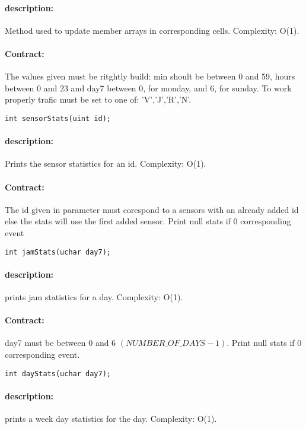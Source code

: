 \documentclass[a4paper, 12pts]{article}
\begin{document}
\paragraph{description:}
	Method used to update member arrays in corresponding cells. Complexity: O(1).
\paragraph{Contract:}
	The values given must be ritghtly build: min shoult be between 0 and 59, hours between 0 and 23 and day7 between 0, for monday, and 6, for sunday. To work properly trafic must be set to one of: 'V','J','R','N'.

\begin{lstlisting}
int sensorStats(uint id);
\end{lstlisting}
\paragraph{description:}
	Prints the sensor statistics for an id. Complexity: O(1).
\paragraph{Contract:}
	The id given in parameter must corespond to a sensors with an already added id else the stats will use the first added sensor. Print null stats if 0 corresponding event

\begin{lstlisting}
int jamStats(uchar day7);
\end{lstlisting}
\paragraph{description:}
	prints jam statistics for a day. Complexity: O(1).
\paragraph{Contract:}
	day7 must be between 0 and 6 $(NUMBER\_OF\_DAYS-1)$. Print null stats if 0 corresponding event.
		
\begin{lstlisting}
int dayStats(uchar day7);
\end{lstlisting}
\paragraph{description:}
	prints a week day statistics for the day. Complexity: O(1).
\end{document}
